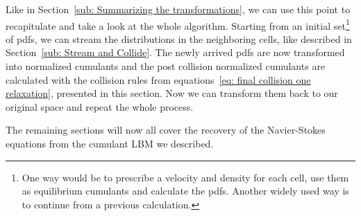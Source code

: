 
Like in Section~\ref{sub: Summarizing the transformations}, we can use this point to recapitulate and take a look at the whole algorithm.
Starting from an initial set\footnote{
One way would be to prescribe a velocity and density for each cell, use them as equilibrium cumulants and calculate the \glspl{pdf}.
Another widely used way is to continue from a previous calculation.
} of \glspl{pdf}, we can stream the distributions in the neighboring cells, like described in Section~\ref{sub: Stream and Collide}.
The newly arrived \glspl{pdf} are now transformed into normalized cumulants and the post collision normalized cumulants are calculated with the collision rules from equations~\eqref{eq: final collision one relaxation}, presented in this section.
Now we can transform them back to our original space and repeat the whole process.

The remaining sections will now all cover the recovery of the Navier-Stokes equations from the cumulant LBM we described.
